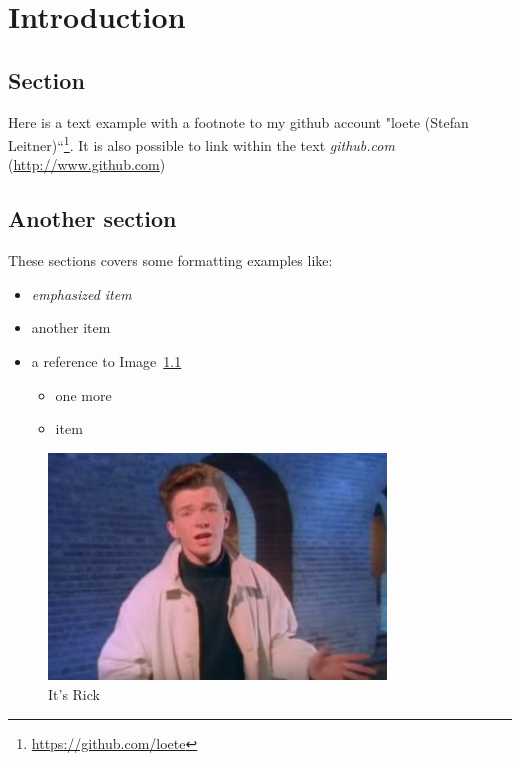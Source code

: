 \chapter[Introduction]{Introduction}

\section{Section}

\blindtext

Here is a text example with a footnote to my github account "loete (Stefan Leitner)“\footnote{\url{https://github.com/loete}}. It is also possible to link within the text \emph{github.com} (\url{http://www.github.com})

\section{Another section}
\label{AnotherSection}

These sections covers some formatting examples like:

\begin{itemize}
	\item \emph{emphasized item}
	\item another item
	\item a reference to Image~\ref{fig:Rick}	
	\begin{itemize}
		\item one more
		\item item
	\end{itemize}
\end{itemize}

\blindtext

\begin{figure}[htb]
  \centering
   \includegraphics[width=0.8\textwidth]{resources/rick.png}
   \caption{It's Rick}
   \label{fig:Rick}
\end{figure}

